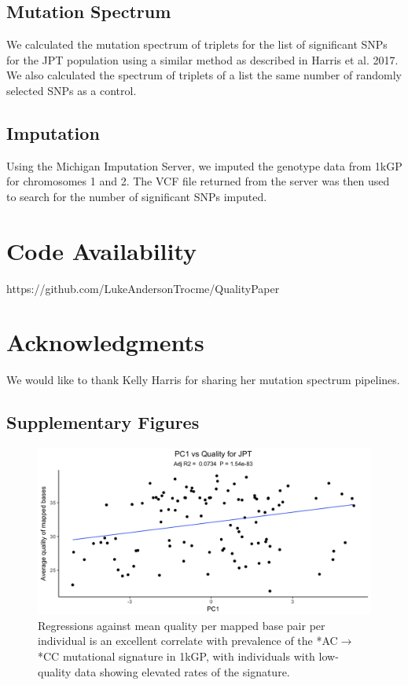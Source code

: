 \documentclass[9pt,lineno]{elife}
\begin{document}
\subsection{Mutation Spectrum}
We calculated the mutation spectrum of triplets for the list of significant SNPs for the JPT population using a similar method as described in Harris et al. 2017. 
We also calculated the spectrum of triplets of a list the same number of randomly selected SNPs as a control.

\subsection{Imputation}
Using the Michigan Imputation Server, we imputed the genotype data from 1kGP for chromosomes 1 and 2. 
The VCF file returned from the server was then used to search for the number of significant SNPs imputed.

\section{Code Availability}
https://github.com/LukeAndersonTrocme/QualityPaper

\section{Acknowledgments}
We would like to thank Kelly Harris for sharing her mutation spectrum pipelines.
 
\subsection{Supplementary Figures}
\begin{figure}
\includegraphics[width=\hsize,keepaspectratio]{PC1_Correlation.jpg}
\caption{Regressions against mean quality per mapped base pair per individual is an excellent correlate with prevalence of the  *AC${\rightarrow}$*CC mutational signature in 1kGP, with individuals with low-quality data showing elevated rates of the signature.  }
\label{PC1_Correlation}
\end{figure}
\end{document}
